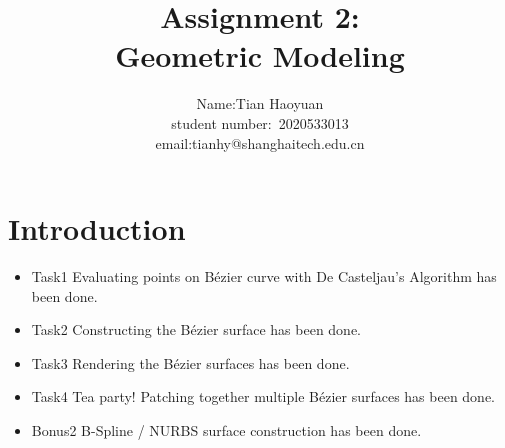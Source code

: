 \documentclass[acmtog]{acmart}
\title{Assignment 2:\\ {Geometric Modeling}}
\author{Name:\quad Tian Haoyuan  \\ student number:\ 2020533013
\\email:\quad tianhy@shanghaitech.edu.cn}
\begin{document}
\maketitle

\vspace*{2 ex}

\section{Introduction}
\begin{itemize}
\item Task1 Evaluating points on Bézier curve with De Casteljau's Algorithm has been done.
\item Task2 Constructing the Bézier surface has been done.
\item Task3 Rendering the Bézier surfaces has been done.
\item Task4 Tea party! Patching together multiple Bézier surfaces has been done.
\item Bonus2 B-Spline / NURBS surface construction has been done.
\end{itemize}
\end{document}
